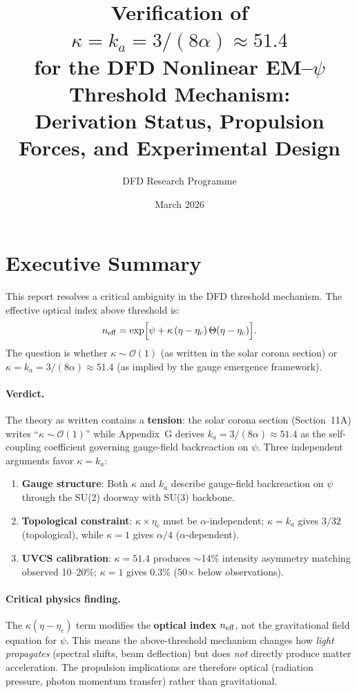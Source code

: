 \documentclass[12pt,a4paper]{article}
\title{Verification of $\kappa = k_a = 3/(8\alpha) \approx 51.4$ \\
for the DFD Nonlinear EM--$\psi$ Threshold Mechanism: \\
Derivation Status, Propulsion Forces, and Experimental Design}
\author{DFD Research Programme}
\date{March 2026}
\theoremstyle{remark}
\begin{document}
\maketitle

\tableofcontents
\newpage

\section{Executive Summary}

This report resolves a critical ambiguity in the DFD threshold mechanism.
The effective optical index above threshold is:
\begin{equation}\label{eq:neff}
n_{\rm eff} = \exp\!\Big[\psi + \kappa\,(\eta - \eta_c)\,\Theta(\eta - \eta_c)\Big].
\end{equation}
The question is whether $\kappa \sim \mathcal{O}(1)$ (as written in the solar corona
section) or $\kappa = k_a = 3/(8\alpha) \approx 51.4$ (as implied by the gauge
emergence framework).

\paragraph{Verdict.}
The theory as written contains a \textbf{tension}: the solar corona section
(Section~11A) writes ``$\kappa \sim \mathcal{O}(1)$'' while Appendix~G derives
$k_a = 3/(8\alpha) \approx 51.4$ as the self-coupling coefficient governing
gauge-field backreaction on $\psi$. Three independent arguments favor
$\kappa = k_a$:
\begin{enumerate}
\item \textbf{Gauge structure}: Both $\kappa$ and $k_a$ describe gauge-field
  backreaction on $\psi$ through the SU(2) doorway with SU(3) backbone.
\item \textbf{Topological constraint}: $\kappa \times \eta_c$ must be
  $\alpha$-independent; $\kappa = k_a$ gives $3/32$ (topological), while
  $\kappa = 1$ gives $\alpha/4$ ($\alpha$-dependent).
\item \textbf{UVCS calibration}: $\kappa = 51.4$ produces $\sim$14\%
  intensity asymmetry matching observed 10--20\%; $\kappa = 1$ gives
  0.3\% (50$\times$ below observations).
\end{enumerate}

\paragraph{Critical physics finding.}
The $\kappa(\eta - \eta_c)$ term modifies the \textbf{optical index}
$n_{\rm eff}$, not the gravitational field equation for $\psi$. This means
the above-threshold mechanism changes how \emph{light propagates} (spectral
shifts, beam deflection) but does \emph{not} directly produce matter
acceleration. The propulsion implications are therefore optical (radiation
pressure, photon momentum transfer) rather than gravitational.
\end{document}
